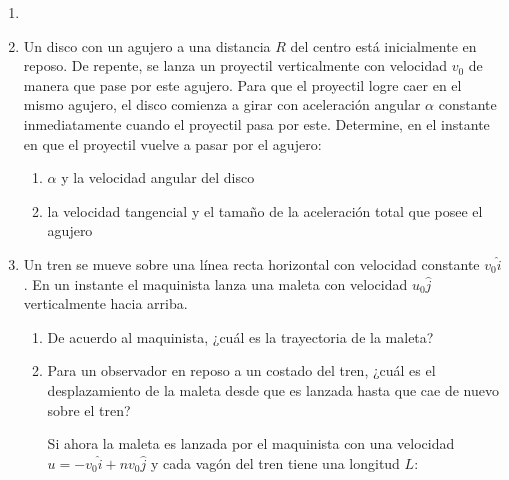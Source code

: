 \documentclass[letterpaper,11pt]{article}
\begin{document}
\vspace{-1cm}
\begin{enumerate}\setlength{\itemsep}{0.4cm}


\item[]

\item Un disco con un agujero a una distancia $R$ del centro está inicialmente en reposo. De repente, se lanza un proyectil verticalmente con velocidad $v_0$ de manera que pase por este agujero. Para que el proyectil logre caer en el mismo agujero, el disco comienza a girar con aceleración angular $\alpha$ constante inmediatamente cuando el proyectil pasa por este. Determine, en el instante en que el proyectil vuelve a pasar por el agujero:

\begin{multicols}{2}
    \begin{enumerate}
        \item $\alpha$ y la velocidad angular del disco
        
        \item la velocidad tangencial y el tamaño de la aceleración total que posee el agujero
    \end{enumerate}
    \columnbreak
    
    \begin{figure}[H]
        \centering
        
    \end{figure}
    
\end{multicols}

\item Un tren se mueve sobre una línea recta horizontal con velocidad constante $v_0\hat{i}$. En un instante el maquinista lanza una maleta con velocidad $u_0\hat{j}$ verticalmente hacia arriba.

    \begin{enumerate}
        \item De acuerdo al maquinista, ¿cuál es la trayectoria de la maleta?
        
        \item Para un observador en reposo a un costado del tren, ¿cuál es el desplazamiento de la maleta desde que es lanzada hasta que cae de nuevo sobre el tren?
    
    Si ahora la maleta es lanzada por el maquinista con una velocidad $u = -v_0\hat{i} + n v_0\hat{j}$ y cada vagón del tren tiene una longitud $L$:
    

\end{enumerate}
\end{enumerate}
\end{document}
